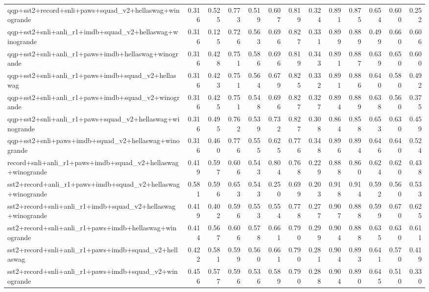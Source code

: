 \begin{table}[t]
\begin{tabular}{lrrrrrrrrrrrr}
    qqp+sst2+record+snli+paws+squad\_v2+hellaswag+winogrande & 0.316 & 0.525 & 0.773 & 0.519 & 0.607 & 0.819 & 0.324 & 0.891 & 0.875 & 0.654 & 0.600 & 0.252 \\
    qqp+sst2+snli+anli\_r1+imdb+squad\_v2+hellaswag+winogrande & 0.316 & 0.125 & 0.726 & 0.563 & 0.696 & 0.827 & 0.331 & 0.899 & 0.889 & 0.499 & 0.660 & 0.606 \\
    qqp+sst2+snli+anli\_r1+paws+imdb+hellaswag+winogrande & 0.316 & 0.428 & 0.751 & 0.586 & 0.696 & 0.819 & 0.343 & 0.891 & 0.887 & 0.639 & 0.650 & 0.600 \\
    qqp+sst2+snli+anli\_r1+paws+imdb+squad\_v2+hellaswag & 0.316 & 0.423 & 0.751 & 0.564 & 0.679 & 0.825 & 0.332 & 0.891 & 0.886 & 0.640 & 0.580 & 0.492 \\
    qqp+sst2+snli+anli\_r1+paws+imdb+squad\_v2+winogrande & 0.316 & 0.425 & 0.751 & 0.548 & 0.696 & 0.827 & 0.327 & 0.894 & 0.889 & 0.638 & 0.560 & 0.375 \\
    qqp+sst2+snli+anli\_r1+paws+squad\_v2+hellaswag+winogrande & 0.316 & 0.495 & 0.762 & 0.539 & 0.732 & 0.827 & 0.308 & 0.864 & 0.858 & 0.653 & 0.630 & 0.459 \\
    qqp+sst2+snli+paws+imdb+squad\_v2+hellaswag+winogrande & 0.316 & 0.460 & 0.776 & 0.555 & 0.625 & 0.776 & 0.348 & 0.896 & 0.894 & 0.646 & 0.640 & 0.524 \\
    record+snli+anli\_r1+paws+imdb+squad\_v2+hellaswag+winogrande & 0.419 & 0.597 & 0.606 & 0.543 & 0.804 & 0.768 & 0.229 & 0.888 & 0.860 & 0.624 & 0.620 & 0.438 \\
    sst2+record+anli\_r1+paws+imdb+squad\_v2+hellaswag+winogrande & 0.581 & 0.596 & 0.653 & 0.543 & 0.250 & 0.699 & 0.203 & 0.918 & 0.914 & 0.592 & 0.560 & 0.533 \\
    sst2+record+snli+anli\_r1+imdb+squad\_v2+hellaswag+winogrande & 0.419 & 0.402 & 0.596 & 0.553 & 0.554 & 0.778 & 0.277 & 0.907 & 0.888 & 0.599 & 0.670 & 0.625 \\
    sst2+record+snli+anli\_r1+paws+imdb+hellaswag+winogrande & 0.414 & 0.567 & 0.606 & 0.578 & 0.661 & 0.790 & 0.299 & 0.904 & 0.888 & 0.635 & 0.630 & 0.611 \\
    sst2+record+snli+anli\_r1+paws+imdb+squad\_v2+hellaswag & 0.422 & 0.581 & 0.599 & 0.560 & 0.661 & 0.790 & 0.281 & 0.904 & 0.893 & 0.641 & 0.570 & 0.419 \\
    sst2+record+snli+anli\_r1+paws+imdb+squad\_v2+winogrande & 0.456 & 0.577 & 0.596 & 0.536 & 0.589 & 0.790 & 0.288 & 0.904 & 0.890 & 0.645 & 0.510 & 0.330 \\

\end{tabular}
\end{table}
